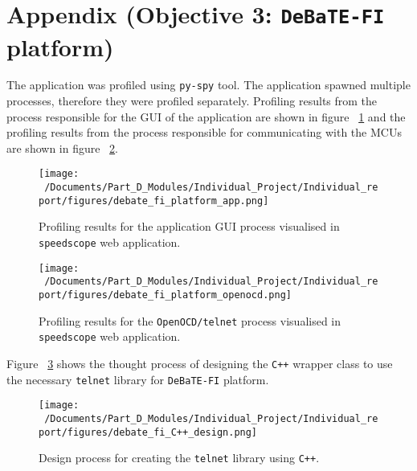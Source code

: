 \newpage
\section{Appendix (Objective 3: \texttt{DeBaTE-FI} platform)}
\label{sec:app_obj3}

The application was profiled using \texttt{py-spy} tool. The application spawned multiple processes, therefore they were profiled separately. Profiling results from the process responsible for the GUI of the application are shown in figure ~\ref{fig:debate_profile_1} and the profiling results from the process responsible for communicating with the MCUs are shown in figure ~\ref{fig:debate_profile_2}.

\begin{figure}[H] %
	\centering
	\texttt{[image: ~/Documents/Part\_D\_Modules/Individual\_Project/Individual\_report/figures/debate\_fi\_platform\_app.png]} %
	\caption{Profiling results for the application GUI process visualised in \texttt{speedscope} web application\cite{speedscope_app}. }
	\label{fig:debate_profile_1} %
\end{figure}

\begin{figure}[H] %
	\centering
	\texttt{[image: ~/Documents/Part\_D\_Modules/Individual\_Project/Individual\_report/figures/debate\_fi\_platform\_openocd.png]} %
	\caption{Profiling results for the \texttt{OpenOCD/telnet} process visualised in \texttt{speedscope} web application\cite{speedscope_app}.}
	\label{fig:debate_profile_2} %
\end{figure}

Figure ~\ref{fig:debate_fi_telnetlibcpp} shows the thought process of designing the \texttt{C++} wrapper class to use the necessary \texttt{telnet} library for \texttt{DeBaTE-FI} platform. 

\begin{figure}[H] %
	\centering
	\texttt{[image: ~/Documents/Part\_D\_Modules/Individual\_Project/Individual\_report/figures/debate\_fi\_C++\_design.png]} %
	\caption{Design process for creating the \texttt{telnet} library using \texttt{C++}.}
	\label{fig:debate_fi_telnetlibcpp} %
\end{figure}

